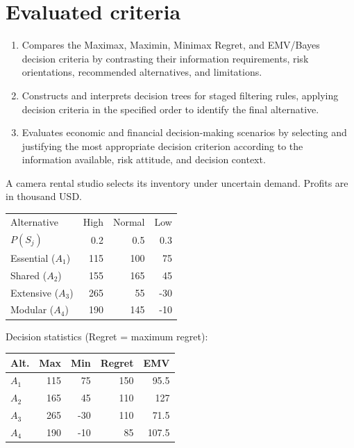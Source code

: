 \section*{Evaluated criteria}
\begin{enumerate}[label=\textbf{C\arabic*},start=8]
\item Compares the Maximax, Maximin, Minimax Regret, and EMV/Bayes decision criteria by contrasting their information requirements, risk orientations, recommended alternatives, and limitations.
\item Constructs and interprets decision trees for staged filtering rules, applying decision criteria in the specified order to identify the final alternative.
\item Evaluates economic and financial decision-making scenarios by selecting and justifying the most appropriate decision criterion according to the information available, risk attitude, and decision context.
\end{enumerate}



A camera rental studio selects its inventory under uncertain demand. Profits are in thousand USD.

\vspace{-3mm}
\begin{center}\small\setlength{\tabcolsep}{4pt}
	\begin{tabular}{lrrr}\toprule
		Alternative & High & Normal & Low\\
		$P(S_j)$ & 0.2 & 0.5 & 0.3\\ \midrule
				Essential ($A_1$) & 115 & 100 & 75\\
		Shared ($A_2$) & 155 & 165 & 45\\
		Extensive ($A_3$) & 265 & 55 & -30\\
		Modular ($A_4$) & 190 & 145 & -10\\
		\bottomrule
	\end{tabular}
\end{center} \vspace*{-3mm}

Decision statistics (Regret = maximum regret):

\vspace{-3mm}
\begin{center}\small\setlength{\tabcolsep}{4pt}
	\begin{tabular}{lrrrr}\toprule
		Alt. & Max & Min & Regret & EMV\\ \midrule
				$A_1$ & 115 & 75 & 150 & 95.5\\
		$A_2$ & 165 & 45 & 110 & 127\\
		$A_3$ & 265 & -30 & 110 & 71.5\\
		$A_4$ & 190 & -10 & 85 & 107.5\\
		\bottomrule
	\end{tabular}
\end{center}
\vspace{-3mm}

